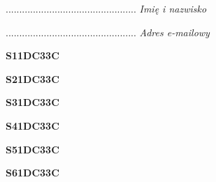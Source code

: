 \begin{turn}{90}\begin{minipage}{\linewidth} \vspace{20mm} ................................................  \textit{Imię i nazwisko}\end{minipage}\end{turn}

\begin{turn}{90}\begin{minipage}{\linewidth} \vspace{20mm} ................................................  \textit{Adres e-mailowy}\end{minipage}\end{turn}

\begin{turn}{90}\huge \begin{minipage}{\linewidth} \vspace{10mm}\textbf{S11DC33C}\end{minipage}\end{turn}

\begin{turn}{90}\huge \begin{minipage}{\linewidth} \vspace{10mm}\textbf{S21DC33C}\end{minipage}\end{turn}

\begin{turn}{90}\huge \begin{minipage}{\linewidth} \vspace{10mm}\textbf{S31DC33C}\end{minipage}\end{turn}

\begin{turn}{90}\huge \begin{minipage}{\linewidth} \vspace{10mm}\textbf{S41DC33C}\end{minipage}\end{turn}

\begin{turn}{90}\huge \begin{minipage}{\linewidth} \vspace{10mm}\textbf{S51DC33C}\end{minipage}\end{turn}

\begin{turn}{90}\huge \begin{minipage}{\linewidth} \vspace{10mm}\textbf{S61DC33C}\end{minipage}\end{turn}

